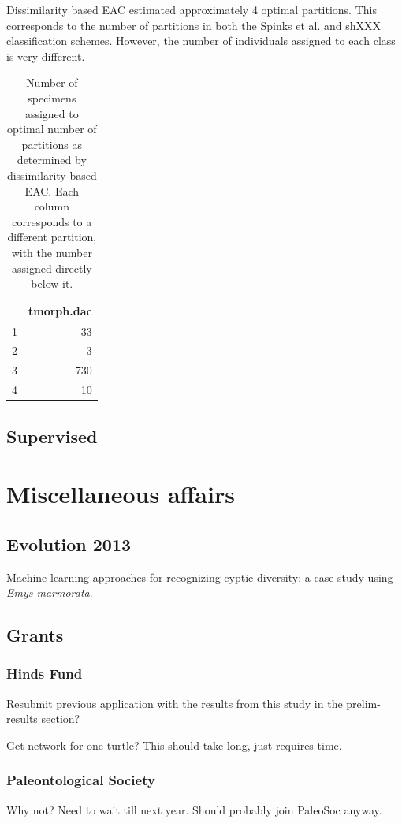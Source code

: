 \documentclass{article}\usepackage{graphicx, color}
\begin{document}
Dissimilarity based EAC estimated approximately 4 optimal partitions. This corresponds to the number of partitions in both the Spinks et al. and shXXX classification schemes. However, the number of individuals assigned to each class is very different.

\begin{table}[ht]
\begin{center}
\begin{tabular}{rr}
  \hline
 & tmorph.dac \\ 
  \hline
1 &  33 \\ 
  2 &   3 \\ 
  3 & 730 \\ 
  4 &  10 \\ 
   \hline
\end{tabular}
\caption{Number of specimens assigned to optimal number of partitions as determined by dissimilarity based EAC. Each column corresponds to a different partition, with the number assigned directly below it.}
\label{tab:dac}
\end{center}
\end{table}







\subsection{Supervised}


\section{Miscellaneous affairs}
\subsection{Evolution 2013}
Machine learning approaches for recognizing cyptic diversity: a case study using \textit{Emys marmorata}.

\subsection{Grants}
\subsubsection{Hinds Fund}
Resubmit previous application with the results from this study in the prelim-results section?

Get network for one turtle? This should take long, just requires time.

\subsubsection{Paleontological Society}
Why not? Need to wait till next year. Should probably join PaleoSoc anyway.
\end{document}

